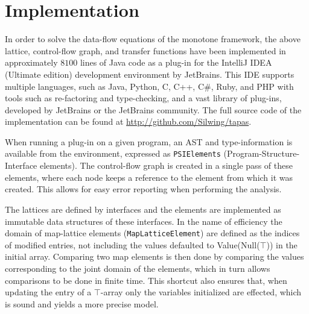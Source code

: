\section{Implementation}
\label{sec:worklist}
In order to solve the data-flow equations of the monotone framework, the above lattice, control-flow graph, and transfer functions have been implemented in approximately $8100$ lines of Java code as a plug-in for the IntelliJ IDEA (Ultimate edition) development environment by JetBrains. This IDE supports multiple languages, such as Java, Python, C, C++, C\#, Ruby, and PHP with tools such as re-factoring and type-checking, and a vast library of plug-ins, developed by JetBrains or the JetBrains community. The full source code of the implementation can be found at \url{http://github.com/Silwing/tapas}.

When running a plug-in on a given program, an AST and type-information is available from the environment, expressed as \texttt{PSIElements} (Program-Structure-Interface elements).  The control-flow graph is created in a single pass of these elements, where each node keeps a reference to the element from which it was created. This allows for easy error reporting when performing the analysis. 

The lattices are defined by interfaces and the elements are implemented as immutable data structures of these interfaces. In the name of efficiency the domain of map-lattice elements (\texttt{MapLatticeElement}) are defined as the indices of modified entries, not including the values defaulted to Value(Null($\top$)) in the initial array. Comparing two map elements is then done by comparing the values corresponding to the joint domain of the elements, which in turn allows comparisons to be done in finite time. This shortcut also ensures that, when updating the entry of a $\top$-array only the variables initialized are effected, which is sound and yields a more precise model.

